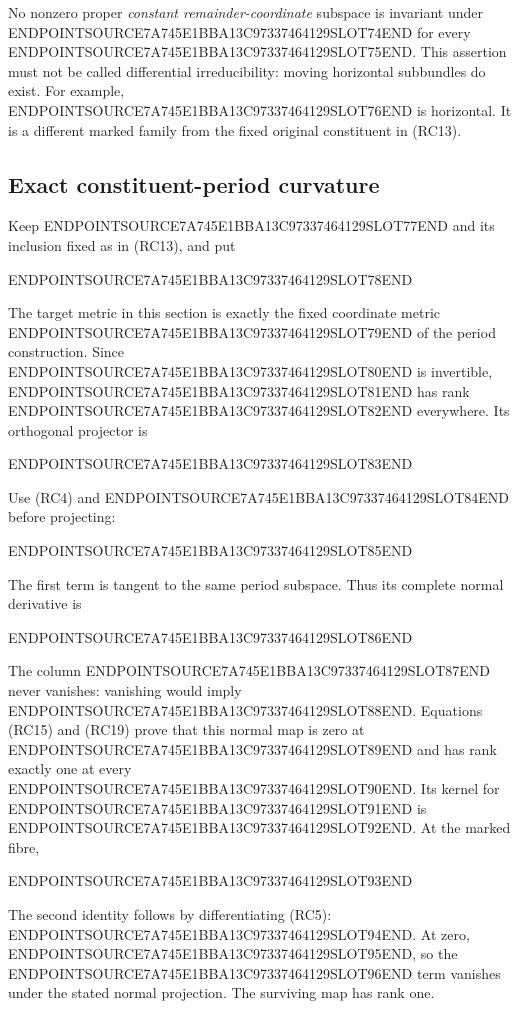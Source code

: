 No nonzero proper \emph{constant remainder-coordinate} subspace is invariant under ENDPOINTSOURCE7A745E1BBA13C97337464129SLOT74END for every ENDPOINTSOURCE7A745E1BBA13C97337464129SLOT75END. This assertion must not be called differential irreducibility: moving horizontal subbundles do exist. For example, ENDPOINTSOURCE7A745E1BBA13C97337464129SLOT76END is horizontal. It is a different marked family from the fixed original constituent in (RC13).

\subsection{Exact constituent-period curvature}\label{endpoint-residue_original--exact-constituent-period-curvature}

Keep ENDPOINTSOURCE7A745E1BBA13C97337464129SLOT77END and its inclusion fixed as in (RC13), and put

ENDPOINTSOURCE7A745E1BBA13C97337464129SLOT78END

The target metric in this section is exactly the fixed coordinate metric ENDPOINTSOURCE7A745E1BBA13C97337464129SLOT79END of the period construction. Since ENDPOINTSOURCE7A745E1BBA13C97337464129SLOT80END is invertible, ENDPOINTSOURCE7A745E1BBA13C97337464129SLOT81END has rank ENDPOINTSOURCE7A745E1BBA13C97337464129SLOT82END everywhere. Its orthogonal projector is

ENDPOINTSOURCE7A745E1BBA13C97337464129SLOT83END

Use (RC4) and ENDPOINTSOURCE7A745E1BBA13C97337464129SLOT84END before projecting:

ENDPOINTSOURCE7A745E1BBA13C97337464129SLOT85END

The first term is tangent to the same period subspace. Thus its complete normal derivative is

ENDPOINTSOURCE7A745E1BBA13C97337464129SLOT86END

The column ENDPOINTSOURCE7A745E1BBA13C97337464129SLOT87END never vanishes: vanishing would imply ENDPOINTSOURCE7A745E1BBA13C97337464129SLOT88END. Equations (RC15) and (RC19) prove that this normal map is zero at ENDPOINTSOURCE7A745E1BBA13C97337464129SLOT89END and has rank exactly one at every ENDPOINTSOURCE7A745E1BBA13C97337464129SLOT90END. Its kernel for ENDPOINTSOURCE7A745E1BBA13C97337464129SLOT91END is ENDPOINTSOURCE7A745E1BBA13C97337464129SLOT92END. At the marked fibre,

ENDPOINTSOURCE7A745E1BBA13C97337464129SLOT93END

The second identity follows by differentiating (RC5): ENDPOINTSOURCE7A745E1BBA13C97337464129SLOT94END. At zero, ENDPOINTSOURCE7A745E1BBA13C97337464129SLOT95END, so the ENDPOINTSOURCE7A745E1BBA13C97337464129SLOT96END term vanishes under the stated normal projection. The surviving map has rank one.

